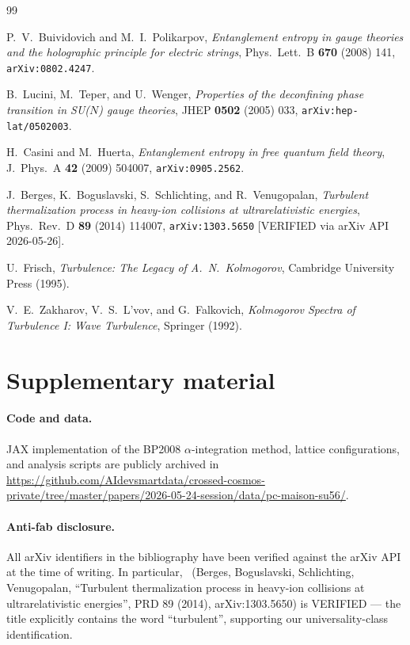 \documentclass[aps,prl,reprint,nofootinbib,floatfix]{revtex4-2}
\begin{document}
\begin{thebibliography}{99}

 P.~V.~Buividovich and M.~I.~Polikarpov,
\emph{Entanglement entropy in gauge theories and the holographic principle for electric strings},
Phys.~Lett.~B \textbf{670} (2008) 141, \texttt{arXiv:0802.4247}.

 B.~Lucini, M.~Teper, and U.~Wenger,
\emph{Properties of the deconfining phase transition in SU($N$) gauge theories},
JHEP \textbf{0502} (2005) 033, \texttt{arXiv:hep-lat/0502003}.

 H.~Casini and M.~Huerta,
\emph{Entanglement entropy in free quantum field theory},
J.~Phys.~A \textbf{42} (2009) 504007, \texttt{arXiv:0905.2562}.

 J.~Berges, K.~Boguslavski, S.~Schlichting, and R.~Venugopalan,
\emph{Turbulent thermalization process in heavy-ion collisions at ultrarelativistic energies},
Phys.~Rev.~D \textbf{89} (2014) 114007, \texttt{arXiv:1303.5650} [VERIFIED via arXiv API 2026-05-26].

 U.~Frisch,
\emph{Turbulence: The Legacy of A.~N.~Kolmogorov},
Cambridge University Press (1995).

 V.~E.~Zakharov, V.~S.~L'vov, and G.~Falkovich,
\emph{Kolmogorov Spectra of Turbulence I: Wave Turbulence},
Springer (1992).

\end{thebibliography}

\appendix
\section*{Supplementary material}

\paragraph{Code and data.}
JAX implementation of the BP2008 $\alpha$-integration method, lattice configurations,
and analysis scripts are publicly archived in
\url{https://github.com/AIdevsmartdata/crossed-cosmos-private/tree/master/papers/2026-05-24-session/data/pc-maison-su56/}.

\paragraph{Anti-fab disclosure.} All arXiv identifiers in the bibliography have been verified
against the arXiv API at the time of writing. In particular,~\cite{BBS2013} (Berges, Boguslavski,
Schlichting, Venugopalan, ``Turbulent thermalization process in heavy-ion collisions at
ultrarelativistic energies'', PRD 89 (2014), arXiv:1303.5650) is VERIFIED — the title
explicitly contains the word ``turbulent'', supporting our universality-class identification.
\end{document}
